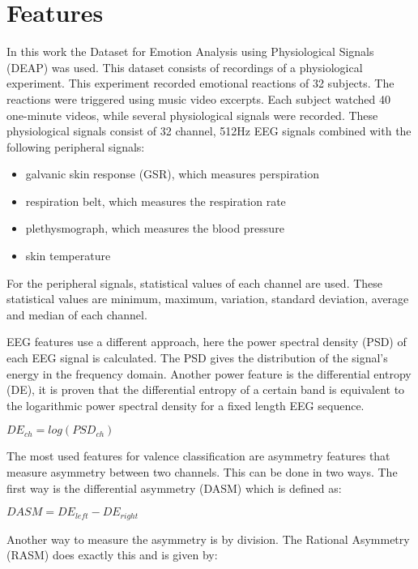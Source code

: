 \documentclass[12pt,journal,compsoc]{IEEEtran}
\newcommand{\npar}{\par \vspace{2.3ex plus 0.3ex minus 0.3ex}}
\begin{document}
\section{Features} \label{features}
\npar
In this work the Dataset for Emotion Analysis using Physiological Signals (DEAP) was used. This dataset consists of recordings of a physiological experiment\citep{DEAP}. This experiment recorded emotional reactions of 32 subjects. The reactions were triggered using music video excerpts. Each subject watched 40 one-minute videos, while several physiological signals were recorded. These physiological signals consist of 32 channel, 512Hz EEG signals combined with the following peripheral signals:
\begin{itemize}
\item galvanic skin response (GSR), which measures perspiration
\item respiration belt, which measures the respiration rate
\item plethysmograph, which measures the blood pressure
\item skin temperature
\end{itemize}
For the peripheral signals, statistical values of each channel are used. These statistical values are minimum, maximum, variation, standard deviation, average and median of each channel. 

\npar

EEG features use a different approach, here the power spectral density (PSD) of each EEG signal is calculated. The PSD gives the distribution of the signal's energy in the frequency domain. Another power feature is the differential entropy (DE), it is proven that the differential entropy of a certain band is equivalent to the logarithmic power spectral density for a fixed length EEG sequence\citep{killyPaper}.

\begin{center}
$DE_{ch} = log(PSD_{ch})$
\end{center}

The most used features for valence classification are asymmetry features that measure asymmetry between two channels\cite{GivenPaper}. This can be done in two ways. The first way is the differential asymmetry (DASM) which is defined as:

\begin{center}
$DASM = DE_{left} - DE_{right}$
\end{center}

Another way to measure the asymmetry is by division. The Rational Asymmetry (RASM) does exactly this and is given by:
\end{document}

